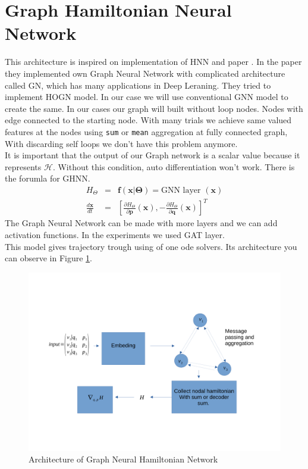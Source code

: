 \section{Graph Hamiltonian Neural Network}
This architecture is inspired on implementation of HNN\cite{hnn} and paper \cite{GNNODE}. In the paper they implemented own Graph Neural Network with complicated architecture called GN, which has many applications in Deep Leraning.  They tried to implement HOGN model.
In our case we will use conventional GNN model to create the same.
In our cases our graph will built without loop nodes. Nodes with edge connected to the starting node. With many trials we achieve same valued features at the nodes using \texttt{sum} or \texttt{mean} aggregation at fully connected graph, With discarding self loops we don't have this problem anymore.\\  It is important that the output of our Graph network is a scalar value because it represents $\mathcal{H}$. Without this condition, auto differentiation won't work. 
There is the forumla for GHNN.
\begin{eqnarray}
	H_{\Theta} &=& \mathbf{f}(\mathbf{x}|\boldsymbol{\Theta})=\text{GNN layer }(\mathbf{x})\\
	\frac{d\mathbf{x}}{dt} &=& \left[\frac{\partial H_{\Theta}}{\partial\mathbf{p}}(\mathbf{x}),-\frac{\partial H_{\Theta}}{\partial\mathbf{q}}(\mathbf{x})\right]^T
\end{eqnarray}
The Graph Neural Network can be made with more layers and we can add activation functions. In the experiments we used GAT layer.\\
This model gives trajectory trough using of one ode solvers. Its architecture you can observe in Figure \ref{ghnn}.
\begin{figure}[h!]
	\includegraphics[width=15cm]{chapters/chapter4/ghnn}
	\caption{Architecture of Graph Neural Hamiltonian Network}
	\label{ghnn}
\end{figure}
